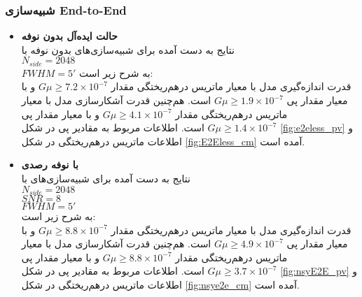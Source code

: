   \subsubsection{  	شبیه‌سازی End-to-End }
  \begin{itemize}
  	\item \textbf{حالت ایده‌آل بدون نوفه} \\
  	نتایج به دست آمده برای شبیه‌سازی‌های بدون نوفه
  	با\\
  	$N_{side} = 2048$ \\
  	$FWHM = 5'$
  	به شرح زیر است:\\
  	قدرت اندازه‌گیری مدل با معیار ماتریس در‌هم‌ریختگی مقدار 
  	$G\mu \geq 7.2\times 10^{-7}$
  	و با معیار مقدار پی 
  	$G\mu \geq 1.9\times 10^{-7}$
  	است. هم‌چنین قدرت آشکارسازی مدل با معیار ماتریس در‌هم‌ریختگی مقدار
  	$G\mu \geq 4.1\times 10^{-7}$
  	و با معیار مقدار پی 
  	$G\mu \geq 1.4\times 10^{-7}$
  	است.
  	اطلاعات مربوط به مقادیر پی در شکل
  	\ref{fig:e2eless_pv}
  	و اطلاعات ماتریس درهم‌ریختگی در شکل
  	\ref{fig:E2Eless_cm}
  	آمده است.
  	
  	\item \textbf{با نوفه رصدی} \\
  	نتایج به دست آمده برای شبیه‌سازی‌های 
  	با\\
  	$N_{side} = 2048$ \\
  	$SNR=8$\\
  	$FWHM = 5'$\\
  	به شرح زیر است:\\
  	قدرت اندازه‌گیری مدل با معیار ماتریس در‌هم‌ریختگی مقدار 
  	$G\mu \geq 8.8\times 10^{-7}$
  	و با معیار مقدار پی 
  	$G\mu \geq 4.9\times 10^{-7}$
  	است. هم‌چنین قدرت آشکارسازی مدل با معیار ماتریس در‌هم‌ریختگی مقدار
  	$G\mu \geq 8.8\times 10^{-7}$
  	و با معیار مقدار پی 
  	$G\mu \geq 3.7\times 10^{-7}$
  	است.
  	اطلاعات مربوط به مقادیر پی در شکل
  	\ref{fig:nsyE2E_pv}
  	و اطلاعات ماتریس درهم‌ریختگی در شکل
  	\ref{fig:nsye2e_cm}
  	آمده است.
  	
  	
  \end{itemize}
  	
